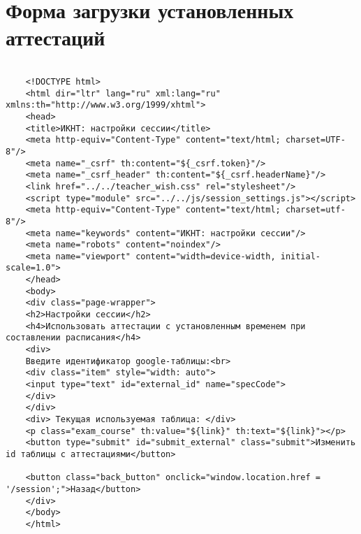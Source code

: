 \chapter{Форма загрузки установленных аттестаций}\label{appendix-ext}	

\begin{lstlisting}
	
	<!DOCTYPE html>
	<html dir="ltr" lang="ru" xml:lang="ru" xmlns:th="http://www.w3.org/1999/xhtml">
	<head>
	<title>ИКНТ: настройки сессии</title>
	<meta http-equiv="Content-Type" content="text/html; charset=UTF-8"/>
	<meta name="_csrf" th:content="${_csrf.token}"/>
	<meta name="_csrf_header" th:content="${_csrf.headerName}"/>
	<link href="../../teacher_wish.css" rel="stylesheet"/>
	<script type="module" src="../../js/session_settings.js"></script>
	<meta http-equiv="Content-Type" content="text/html; charset=utf-8"/>
	<meta name="keywords" content="ИКНТ: настройки сессии"/>
	<meta name="robots" content="noindex"/>
	<meta name="viewport" content="width=device-width, initial-scale=1.0">
	</head>
	<body>
	<div class="page-wrapper">
	<h2>Настройки сессии</h2>
	<h4>Использовать аттестации с установленным временем при составлении расписания</h4>
	<div>
	Введите идентификатор google-таблицы:<br>
	<div class="item" style="width: auto">
	<input type="text" id="external_id" name="specCode">
	</div>
	</div>
	<div> Текущая используемая таблица: </div>
	<p class="exam_course" th:value="${link}" th:text="${link}"></p>
	<button type="submit" id="submit_external" class="submit">Изменить id таблицы с аттестациями</button>
	
	<button class="back_button" onclick="window.location.href = '/session';">Назад</button>
	</div>
	</body>
	</html>
	
\end{lstlisting}
